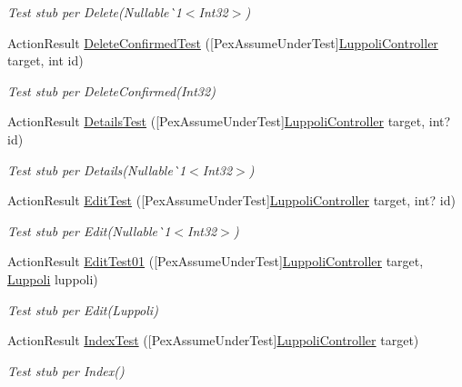 \begin{DoxyCompactItemize}
\begin{DoxyCompactList}\small\item\em Test stub per Delete(Nullable\`{}1$<$Int32$>$)\end{DoxyCompactList}\item 
Action\+Result \mbox{\hyperlink{class_brew_day2_1_1_tests_1_1_luppoli_controller_test_abe54743b31854f4413b01d5f3587ae97}{Delete\+Confirmed\+Test}} (\mbox{[}Pex\+Assume\+Under\+Test\mbox{]}\mbox{\hyperlink{class_brew_day2_1_1_controllers_1_1_luppoli_controller}{Luppoli\+Controller}} target, int id)
\begin{DoxyCompactList}\small\item\em Test stub per Delete\+Confirmed(\+Int32)\end{DoxyCompactList}\item 
Action\+Result \mbox{\hyperlink{class_brew_day2_1_1_tests_1_1_luppoli_controller_test_add00e771366bfdde1deb44292402e1ac}{Details\+Test}} (\mbox{[}Pex\+Assume\+Under\+Test\mbox{]}\mbox{\hyperlink{class_brew_day2_1_1_controllers_1_1_luppoli_controller}{Luppoli\+Controller}} target, int? id)
\begin{DoxyCompactList}\small\item\em Test stub per Details(Nullable\`{}1$<$Int32$>$)\end{DoxyCompactList}\item 
Action\+Result \mbox{\hyperlink{class_brew_day2_1_1_tests_1_1_luppoli_controller_test_a81bf77eb8c8134d81a21da77bb1d2745}{Edit\+Test}} (\mbox{[}Pex\+Assume\+Under\+Test\mbox{]}\mbox{\hyperlink{class_brew_day2_1_1_controllers_1_1_luppoli_controller}{Luppoli\+Controller}} target, int? id)
\begin{DoxyCompactList}\small\item\em Test stub per Edit(Nullable\`{}1$<$Int32$>$)\end{DoxyCompactList}\item 
Action\+Result \mbox{\hyperlink{class_brew_day2_1_1_tests_1_1_luppoli_controller_test_ab50c36017edf6a95f6d877a453a57399}{Edit\+Test01}} (\mbox{[}Pex\+Assume\+Under\+Test\mbox{]}\mbox{\hyperlink{class_brew_day2_1_1_controllers_1_1_luppoli_controller}{Luppoli\+Controller}} target, \mbox{\hyperlink{class_brew_day2_1_1_models_1_1_luppoli}{Luppoli}} luppoli)
\begin{DoxyCompactList}\small\item\em Test stub per Edit(\+Luppoli)\end{DoxyCompactList}\item 
Action\+Result \mbox{\hyperlink{class_brew_day2_1_1_tests_1_1_luppoli_controller_test_af6be3986abe2631ee0fdce2c4106cfb5}{Index\+Test}} (\mbox{[}Pex\+Assume\+Under\+Test\mbox{]}\mbox{\hyperlink{class_brew_day2_1_1_controllers_1_1_luppoli_controller}{Luppoli\+Controller}} target)
\begin{DoxyCompactList}\small\item\em Test stub per Index()\end{DoxyCompactList}\end{DoxyCompactItemize}


